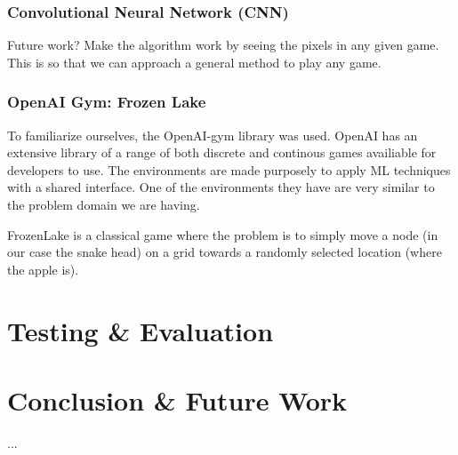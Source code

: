 \documentclass[
a4paper,
11pt,
english
]{report}
\begin{document}
\subsection{Convolutional Neural Network (CNN)}
Future work? Make the algorithm work by seeing the pixels in any given game. This is so that we can approach a general method to play any game.

\subsection{OpenAI Gym: Frozen Lake}
To familiarize ourselves, the OpenAI-gym library was used. OpenAI has an extensive library of a range of both discrete and continous games availiable for developers to use. The environments are made purposely to apply ML techniques with a shared interface. One of the environments they have are very similar to the problem domain we are having.

FrozenLake is a classical game where the problem is to simply move a node (in our case the snake head) on a grid towards a randomly selected location (where the apple is).


\chapter{Testing \& Evaluation}

\chapter{Conclusion \& Future Work}

...


\end{document}
